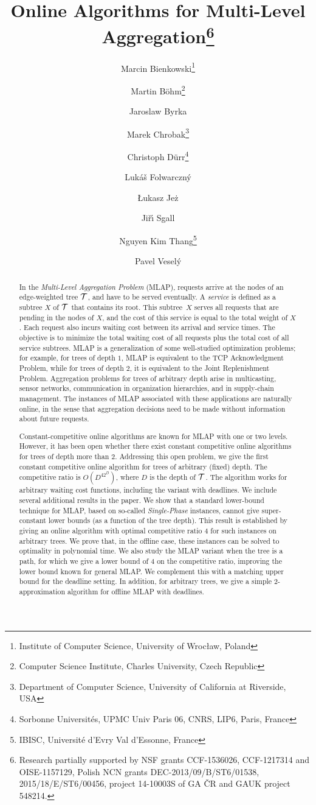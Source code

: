 \documentclass[a4paper]{article}
\title{Online Algorithms for Multi-Level Aggregation\thanks{Research partially supported by NSF grants CCF-1536026, CCF-1217314 and OISE-1157129,
	Polish NCN grants DEC-2013/09/B/ST6/01538, 2015/18/E/ST6/00456,
	project 14-10003S of GA \v{C}R and GAUK project 548214.
}}
\author{Marcin Bienkowski\thanks{Institute of Computer Science, University of Wroc{\l}aw, Poland}
\and
Martin B\"{o}hm\thanks{Computer Science Institute, Charles University, Czech Republic}
\and
Jaroslaw Byrka\footnotemark[2]
\and
Marek Chrobak\thanks{Department of Computer Science, University of California at
  Riverside, USA}
\and
Christoph D\"{u}rr\thanks{Sorbonne Universit\'{e}s, UPMC Univ Paris 06, CNRS, LIP6, Paris, France}
\and
Luk\'{a}\v{s} Folwarczn\'{y}\footnotemark[3]
\and
{\L}ukasz Je\.{z}\footnotemark[2]
\and
Ji\v{r}\'{\i} Sgall\footnotemark[3]
\and
Nguyen Kim Thang\thanks{IBISC, Universit\'{e} d'Evry Val d'Essonne, France}
\and
Pavel Vesel\'{y}\footnotemark[3]}
\newcommand{\calT}{{\cal T}}
\newcommand{\MLAP}{\mbox{\rm\textsf{MLAP}}}
\begin{document}
\maketitle


\begin{abstract}
In the \emph{Multi-Level Aggregation Problem} ({\MLAP}), requests arrive at
the nodes of an edge-weighted tree $\calT$, and have to be served 
eventually.  A \emph{service} is defined as a subtree $X$ of $\calT$ that 
contains its root. This subtree~$X$ serves all
requests that are pending in the nodes of $X$, and the cost of this service is
equal to the total weight of $X$. Each request also incurs waiting cost
between its arrival and service times. The objective is to minimize the total
waiting cost of all requests plus the total cost of all service subtrees.
{\MLAP} is a generalization of some well-studied optimization problems; for
example, for trees of depth $1$, {\MLAP} is equivalent to the TCP
Acknowledgment Problem, while for trees of depth $2$, it is equivalent to the
Joint Replenishment Problem. Aggregation problems for trees of arbitrary depth
arise in multicasting, sensor networks, communication in organization
hierarchies, and in supply-chain management. The instances of {\MLAP}
associated with these applications are naturally online, in the sense that
aggregation decisions need to be made without information about future
requests.

Constant-competitive online algorithms are known for {\MLAP} with one or two
levels. However, it has been open whether there exist constant competitive
online algorithms for trees of depth more than $2$.  Addressing this open
problem, we give the first constant competitive online algorithm for trees
of arbitrary (fixed) depth. The competitive ratio is $O(D^42^D)$,
where $D$ is the depth of $\calT$. The algorithm works for arbitrary waiting
cost functions, including the variant with deadlines.
We include several additional results in the paper. We show that a standard
lower-bound technique for {\MLAP}, based on so-called \emph{Single-Phase}
instances, cannot give super-constant lower bounds (as a function of the tree
depth). This result is established by giving an online algorithm with optimal
competitive ratio $4$ for such instances on arbitrary trees. 
We prove that, in the offline case, these instances can be solved to
optimality in polynomial time.
We also study the {\MLAP} variant when the tree is a path, for which we give
a lower bound of $4$ on the competitive ratio, improving the lower bound known 
for general {\MLAP}.  We complement this with a matching upper bound for the 
deadline setting. 
In addition, for arbitrary trees,
we give a simple 2-approximation algorithm for offline {\MLAP} 
with deadlines.
\end{abstract}
\end{document}
